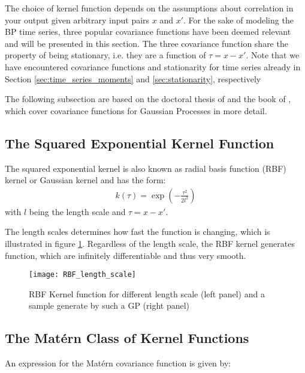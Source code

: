 The choice of kernel function depends on the assumptions about correlation in
your output given arbitrary input pairs $x$ and $x'$.
For the sake of modeling the BP time series, three popular covariance
functions have been deemed relevant and will be presented in this section.
The three covariance function share the property of being stationary,
i.e. they are a function of $\tau = x - x'$.
Note that we have encountered covariance functions and stationarity
for time series already in Section \ref{sec:time_series_moments} and
\ref{sec:stationarity}, respectively

The following subsection are based on the doctoral thesis of
\citeauthor{duvenaud_automatic_2014} and the book of
\citeauthor{rasmussen_gaussian_2006}, which cover covariance functions for
Gaussian Processes in more detail.

\subsection{The Squared Exponential Kernel Function}

The squared exponential kernel is also known as radial basis function (RBF)
kernel or Gaussian kernel and has the form:
\begin{gather*}
k(\tau) = \exp(-\frac{\tau^2}{2 l^2})
\end{gather*}
with $l$ being the length scale and $\tau = x-x'$.

The length scales determines how fast the function is changing, which is
illustrated in figure \ref{fig:rbf}.
Regardless of the length scale, the RBF kernel generates function, which are
infinitely differentiable and thus very smooth.

\begin{figure}[!htb]%
    \centering
    \texttt{[image: RBF\_length\_scale]} %
    \caption[RBF Kernel: Kernel function wiht sample path]%
   {RBF Kernel function for different length scale (left panel) and a sample
    generate by such a GP (right panel)}
    \label{fig:rbf}
\end{figure}


\subsection{The Matérn Class of Kernel Functions}

An expression for the Matérn covariance function is given by:

